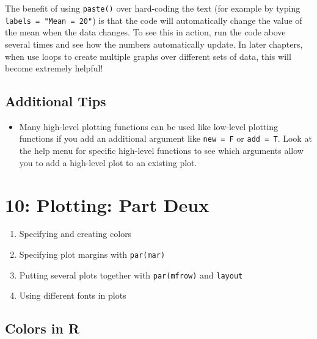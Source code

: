 \documentclass{tufte-book}\usepackage[]{graphicx}\usepackage[]{color}
\begin{document}
The benefit of using \texttt{paste()} over hard-coding the text (for example by typing \texttt{labels = "Mean = 20"}) is that the code will automatically change the value of the mean when the data changes. To see this in action, run the code above several times and see how the numbers automatically update. In later chapters, when use loops to create multiple graphs over different sets of data, this will become extremely helpful!


\section{Additional Tips}

\begin{itemize}

  \item Many high-level plotting functions can be used like low-level plotting functions if you add an additional argument like \texttt{new = F} or \texttt{add = T}. Look at the help menu for specific high-level functions to see which arguments allow you to add a high-level plot to an existing plot.


\end{itemize}






\chapter{10: Plotting: Part Deux}
\label{ch:10}

\begin{enumerate}

  \item Specifying and creating colors
  \item Specifying plot margins with \texttt{par(mar)}
  \item Putting several plots together with \texttt{par(mfrow)} and \texttt{layout}
  \item Using different fonts in plots

\end{enumerate}



\section{Colors in R}
\end{document}
